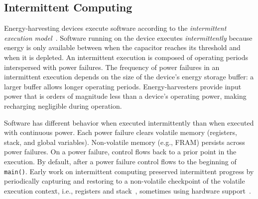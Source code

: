 
\subsection{Intermittent Computing}
\label{sec:background_consistency}

Energy-harvesting devices execute software according to the {\em intermittent execution model}~\cite{dino,chain,alpaca,ratchet}.
%
%
Software running on the device executes {\em intermittently} because energy is only available between when the capacitor reaches its threshold and when it is depleted. An intermittent execution is composed of operating periods interspersed with power failures. The frequency of power failures in an intermittent execution depends on the size of the device's energy storage buffer: a larger buffer allows longer operating periods. Energy-harvesters provide input power that is orders of magnitude less than a device's operating power, making recharging negligible during operation.

Software has different behavior when executed intermittently than when executed with continuous power. Each power failure clears volatile memory (registers, stack, and global variables). Non-volatile memory (e.g., FRAM) persists across power failures. On a power failure, control flows back to a prior point in the execution. By default, after a power failure control flows to the beginning of {\tt main()}. Early work on intermittent computing preserved intermittent progress by periodically capturing and restoring to a non-volatile checkpoint of the volatile execution context, i.e., registers and stack~\cite{mementos,quickrecall}, sometimes using hardware support~\cite{mementos,mottola2017harvos,hibernusplusplus,hibernus,idetic}. 

